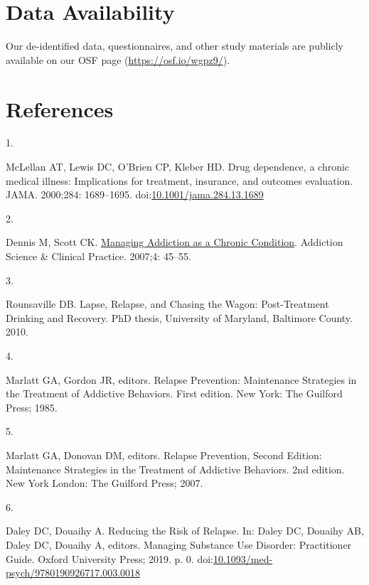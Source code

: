 \documentclass[
  letterpaper,
  DIV=11,
  numbers=noendperiod]{scrartcl}
\newlength{\cslhangindent}
\newlength{\csllabelwidth}
\newenvironment{CSLReferences}[2] %
 {\begin{list}{}{%
  \setlength{\itemindent}{0pt}
  \setlength{\leftmargin}{0pt}
  \setlength{\parsep}{0pt}
  \ifodd #1
   \setlength{\leftmargin}{\cslhangindent}
   \setlength{\itemindent}{-1\cslhangindent}
  \fi
  \setlength{\itemsep}{#2\baselineskip}}}
 {\end{list}}
\newcommand{\CSLLeftMargin}[1]{\parbox[t]{\csllabelwidth}{\strut#1\strut}}
\newcommand{\CSLRightInline}[1]{\parbox[t]{\linewidth - \csllabelwidth}{\strut#1\strut}}
\begin{document}
\section{Data Availability}\label{data-availability}

Our de-identified data, questionnaires, and other study materials are
publicly available on our OSF page (\url{https://osf.io/wgpz9/}).

\newpage

\section*{References}\label{references}

\protect{}\label{refs}
\begin{CSLReferences}{0}{1}
\CSLLeftMargin{1. }%
\CSLRightInline{McLellan AT, Lewis DC, O'Brien CP, Kleber HD. Drug
dependence, a chronic medical illness: Implications for treatment,
insurance, and outcomes evaluation. JAMA. 2000;284: 1689--1695.
doi:\href{https://doi.org/10.1001/jama.284.13.1689}{10.1001/jama.284.13.1689}}

\CSLLeftMargin{2. }%
\CSLRightInline{Dennis M, Scott CK.
\href{https://www.ncbi.nlm.nih.gov/pmc/articles/PMC2797101}{Managing
{Addiction} as a {Chronic Condition}}. Addiction Science \& Clinical
Practice. 2007;4: 45--55. }

\CSLLeftMargin{3. }%
\CSLRightInline{Rounsaville DB. Lapse, {Relapse}, and {Chasing} the
{Wagon}: {Post-Treatment Drinking} and {Recovery}. PhD thesis,
University of Maryland, Baltimore County. 2010. }

\CSLLeftMargin{4. }%
\CSLRightInline{Marlatt GA, Gordon JR, editors. Relapse {Prevention}:
{Maintenance Strategies} in the {Treatment} of {Addictive Behaviors}.
First edition. New York: The Guilford Press; 1985. }

\CSLLeftMargin{5. }%
\CSLRightInline{Marlatt GA, Donovan DM, editors. Relapse {Prevention},
{Second Edition}: {Maintenance Strategies} in the {Treatment} of
{Addictive Behaviors}. 2nd edition. New York London: The Guilford Press;
2007. }

\CSLLeftMargin{6. }%
\CSLRightInline{Daley DC, Douaihy A. Reducing the {Risk} of {Relapse}.
In: Daley DC, Douaihy AB, Daley DC, Douaihy A, editors. Managing
{Substance Use Disorder}: {Practitioner Guide}. Oxford University Press;
2019. p. 0.
doi:\href{https://doi.org/10.1093/med-psych/9780190926717.003.0018}{10.1093/med-psych/9780190926717.003.0018}}


\end{CSLReferences}
\end{document}
